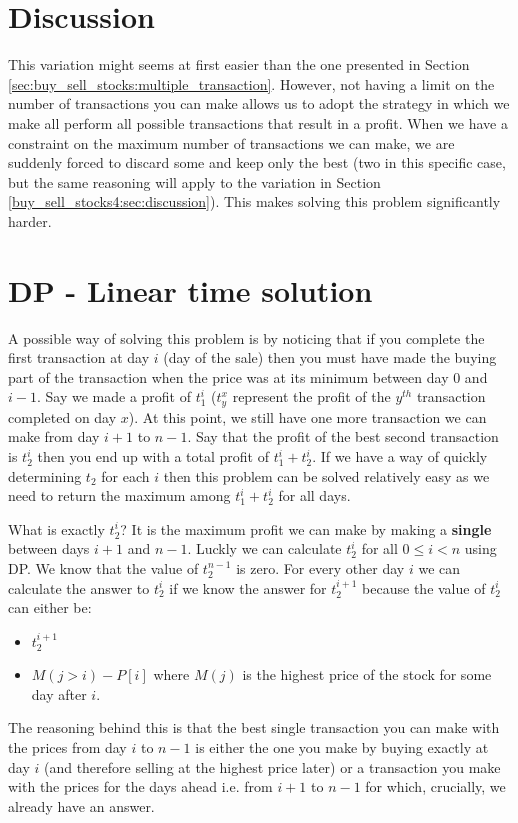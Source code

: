\section{Discussion}
\label{buy_sell_stocks_3:sec:discussion}
This variation might seems at first easier than the one presented in Section \ref{sec:buy_sell_stocks:multiple_transaction}. 
However, not having a limit on the number of transactions you can make allows us to adopt the strategy in which we make 
all perform all possible transactions that result in a profit. 
When we have a constraint on the maximum number of transactions we can make, we are suddenly forced to discard some and keep only the best (two in this specific case, but the same reasoning will apply to the variation in Section \ref{buy_sell_stocks4:sec:discussion}).
This makes solving this problem significantly harder.


\section{DP - Linear time solution}
\label{buy_sell_stocks_3:sec:linear}
A possible way of solving this problem is by noticing that if you complete the first transaction at day $i$ (day of the sale) then
you must have made the buying part of the transaction when the price was at its minimum between day $0$ and $i-1$. Say we made a profit of $t^i_1$ ($t^x_y$ represent the profit of the $y^{th}$ transaction completed on day $x$).
At this point, we still have one more transaction we can make from day $i+1$ to $n-1$. Say that the profit of the best second transaction is $t^i_2$ then you end up with a total profit of $t^i_1+t^i_2$. If we have a way of quickly determining $t_2$ for each $i$ then this problem can be solved relatively easy as we need to return the maximum among $t^i_1+t^i_2$ for all days.

What is exactly $t^i_2$? It is the maximum profit we can make by making a \textbf{single} between days $i+1$ and $n-1$. 
Luckly we can calculate $t^i_2$ for all $0 \leq i < n$ using DP. We know that the value of $t^{n-1}_2$ is zero. For every other day $i$ 
we can calculate the answer to $t^i_2$ if we know the answer for $t^{i+1}_2$ because  the value of $t^i_2$ can either be:
\begin{itemize}
    \item $t^{i+1}_2$ 
    \item $M(j > i)-P[i]$ where $M(j)$ is the highest price of the stock for some day after $i$.
\end{itemize}
The reasoning behind this is that the best single transaction you can make with the prices from day $i$ to $n-1$ is either the one you make by buying exactly at day $i$ (and therefore selling at the highest price later) or a transaction you make with the prices for the days ahead i.e. from $i+1$ to $n-1$ for which, crucially, we already have an answer. 


